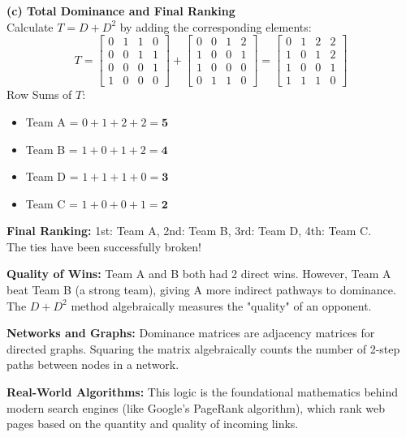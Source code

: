 \begin{solution}
\medskip
\textbf{(c) Total Dominance and Final Ranking} \\
Calculate $T = D + D^2$ by adding the corresponding elements:
\[
T = 
\begin{bmatrix} 0 & 1 & 1 & 0 \\ 0 & 0 & 1 & 1 \\ 0 & 0 & 0 & 1 \\ 1 & 0 & 0 & 0 \end{bmatrix}
+
\begin{bmatrix} 0 & 0 & 1 & 2 \\ 1 & 0 & 0 & 1 \\ 1 & 0 & 0 & 0 \\ 0 & 1 & 1 & 0 \end{bmatrix}
=
\begin{bmatrix} 
0 & 1 & 2 & 2 \\ 
1 & 0 & 1 & 2 \\ 
1 & 0 & 0 & 1 \\ 
1 & 1 & 1 & 0 
\end{bmatrix}
\]
Row Sums of $T$:
\begin{itemize}
  \item Team A = $0+1+2+2 = \textbf{5}$
  \item Team B = $1+0+1+2 = \textbf{4}$
  \item Team D = $1+1+1+0 = \textbf{3}$
  \item Team C = $1+0+0+1 = \textbf{2}$
\end{itemize}

\textbf{Final Ranking:} 1st: Team A, 2nd: Team B, 3rd: Team D, 4th: Team C. \\
The ties have been successfully broken!
\end{solution}

\begin{takeaways}
\item \textbf{Quality of Wins:} Team A and B both had 2 direct wins. However, Team A beat Team B (a strong team), giving A more indirect pathways to dominance. The $D+D^2$ method algebraically measures the "quality" of an opponent.
\item \textbf{Networks and Graphs:} Dominance matrices are adjacency matrices for directed graphs. Squaring the matrix algebraically counts the number of 2-step paths between nodes in a network.
\item \textbf{Real-World Algorithms:} This logic is the foundational mathematics behind modern search engines (like Google's PageRank algorithm), which rank web pages based on the quantity and quality of incoming links.
\end{takeaways}
